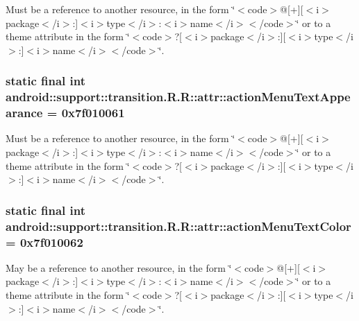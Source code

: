 Must be a reference to another resource, in the form \char`\"{}$<$code$>$@\mbox{[}+\mbox{]}\mbox{[}$<$i$>$package$<$/i$>$:\mbox{]}$<$i$>$type$<$/i$>$:$<$i$>$name$<$/i$>$$<$/code$>$\char`\"{} or to a theme attribute in the form \char`\"{}$<$code$>$?\mbox{[}$<$i$>$package$<$/i$>$:\mbox{]}\mbox{[}$<$i$>$type$<$/i$>$:\mbox{]}$<$i$>$name$<$/i$>$$<$/code$>$\char`\"{}. \hypertarget{classandroid_1_1support_1_1transition_1_1_r_1_1attr_10d81021182c47eccba79c2a45a6a1d2}{
\subsubsection[{actionMenuTextAppearance}]{\setlength{\rightskip}{0pt plus 5cm}static final int android::support::transition.R.R::attr::actionMenuTextAppearance = 0x7f010061}}
\label{classandroid_1_1support_1_1transition_1_1_r_1_1attr_10d81021182c47eccba79c2a45a6a1d2}


Must be a reference to another resource, in the form \char`\"{}$<$code$>$@\mbox{[}+\mbox{]}\mbox{[}$<$i$>$package$<$/i$>$:\mbox{]}$<$i$>$type$<$/i$>$:$<$i$>$name$<$/i$>$$<$/code$>$\char`\"{} or to a theme attribute in the form \char`\"{}$<$code$>$?\mbox{[}$<$i$>$package$<$/i$>$:\mbox{]}\mbox{[}$<$i$>$type$<$/i$>$:\mbox{]}$<$i$>$name$<$/i$>$$<$/code$>$\char`\"{}. \hypertarget{classandroid_1_1support_1_1transition_1_1_r_1_1attr_4502e0addb39dbf3126f1a8566d99bab}{
\subsubsection[{actionMenuTextColor}]{\setlength{\rightskip}{0pt plus 5cm}static final int android::support::transition.R.R::attr::actionMenuTextColor = 0x7f010062}}
\label{classandroid_1_1support_1_1transition_1_1_r_1_1attr_4502e0addb39dbf3126f1a8566d99bab}


May be a reference to another resource, in the form \char`\"{}$<$code$>$@\mbox{[}+\mbox{]}\mbox{[}$<$i$>$package$<$/i$>$:\mbox{]}$<$i$>$type$<$/i$>$:$<$i$>$name$<$/i$>$$<$/code$>$\char`\"{} or to a theme attribute in the form \char`\"{}$<$code$>$?\mbox{[}$<$i$>$package$<$/i$>$:\mbox{]}\mbox{[}$<$i$>$type$<$/i$>$:\mbox{]}$<$i$>$name$<$/i$>$$<$/code$>$\char`\"{}. 

